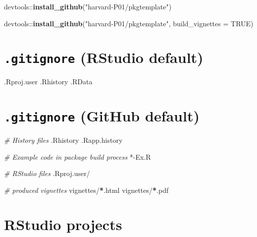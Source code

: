 \documentclass[]{book}
\newenvironment{Shaded}{\begin{snugshade}}{\end{snugshade}}
\newcommand{\KeywordTok}[1]{\textcolor[rgb]{0.13,0.29,0.53}{\textbf{{#1}}}}
\newcommand{\DataTypeTok}[1]{\textcolor[rgb]{0.13,0.29,0.53}{{#1}}}
\newcommand{\StringTok}[1]{\textcolor[rgb]{0.31,0.60,0.02}{{#1}}}
\newcommand{\CommentTok}[1]{\textcolor[rgb]{0.56,0.35,0.01}{\textit{{#1}}}}
\newcommand{\OtherTok}[1]{\textcolor[rgb]{0.56,0.35,0.01}{{#1}}}
\newcommand{\ErrorTok}[1]{\textcolor[rgb]{0.64,0.00,0.00}{\textbf{{#1}}}}
\newcommand{\NormalTok}[1]{{#1}}
\theoremstyle{definition}
\theoremstyle{definition}
\theoremstyle{definition}
\theoremstyle{remark}
\begin{document}
\begin{Shaded}
\begin{Highlighting}[]
\NormalTok{devtools::}\KeywordTok{install_github}\NormalTok{(}\StringTok{"harvard-P01/pkgtemplate"}\NormalTok{)}
\end{Highlighting}
\end{Shaded}

\begin{Shaded}
\begin{Highlighting}[]
\NormalTok{devtools::}\KeywordTok{install_github}\NormalTok{(}\StringTok{"harvard-P01/pkgtemplate"}\NormalTok{,}
                         \DataTypeTok{build_vignettes =} \OtherTok{TRUE}\NormalTok{)}
\end{Highlighting}
\end{Shaded}

\section{\texorpdfstring{\texttt{.gitignore} (RStudio
default)}{.gitignore (RStudio default)}}\label{gitignore-rstudio-default}

\begin{Shaded}
\begin{Highlighting}[]
\NormalTok{.Rproj.user}
\NormalTok{.Rhistory}
\NormalTok{.RData}
\end{Highlighting}
\end{Shaded}

\section{\texorpdfstring{\texttt{.gitignore} (GitHub
default)}{.gitignore (GitHub default)}}\label{gitignore-github-default}

\begin{Shaded}
\begin{Highlighting}[]
\CommentTok{# History files}
\NormalTok{.Rhistory}
\NormalTok{.Rapp.history}

\CommentTok{# Example code in package build process}
\NormalTok{*-Ex.R}

\CommentTok{# RStudio files}
\NormalTok{.Rproj.user/}

\CommentTok{# produced vignettes}
\NormalTok{vignettes/}\ErrorTok{*}\NormalTok{.html}
\NormalTok{vignettes/}\ErrorTok{*}\NormalTok{.pdf}
\end{Highlighting}
\end{Shaded}

\section{RStudio projects}\label{rstudio-projects}
\end{document}
